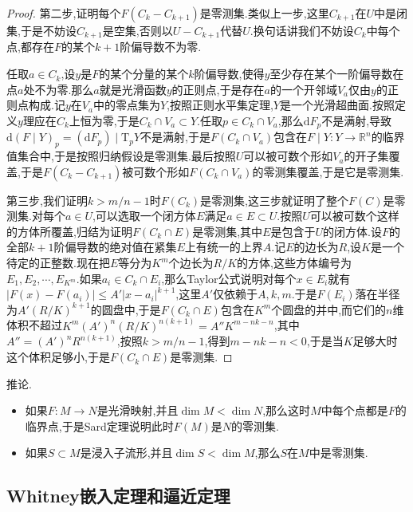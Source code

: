 \begin{proof}
	\qquad
	
	第二步,证明每个$F(C_k-C_{k+1})$是零测集.类似上一步,这里$C_{k+1}$在$U$中是闭集,于是不妨设$C_{k+1}$是空集,否则以$U-C_{k+1}$代替$U$.换句话讲我们不妨设$C_k$中每个点,都存在$F$的某个$k+1$阶偏导数不为零.
	
	\qquad
	
	任取$a\in C_k$,设$y$是$F$的某个分量的某个$k$阶偏导数,使得$y$至少存在某个一阶偏导数在点$a$处不为零.那么$a$就是光滑函数$y$的正则点,于是存在$a$的一个开邻域$V_a$仅由$y$的正则点构成.记$y$在$V_a$中的零点集为$Y$,按照正则水平集定理,$Y$是一个光滑超曲面.按照定义$y$理应在$C_k$上恒为零,于是$C_k\cap V_a\subset Y$.任取$p\in C_k\cap V_a$,那么$\mathrm{d}F_p$不是满射,导致$\mathrm{d}(F\mid Y)_p=(\mathrm{d}F_p)\mid\mathrm{T}_pY$不是满射,于是$F(C_k\cap V_a)$包含在$F\mid Y:Y\to\mathbb{R}^n$的临界值集合中,于是按照归纳假设是零测集.最后按照$U$可以被可数个形如$V_a$的开子集覆盖,于是$F(C_k-C_{k+1})$被可数个形如$F(C_k\cap V_a)$的零测集覆盖,于是它是零测集.
	
	\qquad
	
	第三步,我们证明$k>m/n-1$时$F(C_k)$是零测集,这三步就证明了整个$F(C)$是零测集.对每个$a\in U$,可以选取一个闭方体$E$满足$a\in E\subset U$.按照$U$可以被可数个这样的方体所覆盖,归结为证明$F(C_k\cap E)$是零测集,其中$E$是包含于$U$的闭方体.设$F$的全部$k+1$阶偏导数的绝对值在紧集$E$上有统一的上界$A$.记$E$的边长为$R$,设$K$是一个待定的正整数.现在把$E$等分为$K^m$个边长为$R/K$的方体,这些方体编号为$E_1,E_2,\cdots,E_{K^m}$.如果$a_i\in C_k\cap E_i$,那么Taylor公式说明对每个$x\in E_i$就有$|F(x)-F(a_i)|\le A'|x-a_i|^{k+1}$,这里$A'$仅依赖于$A,k,m$.于是$F(E_i)$落在半径为$A'(R/K)^{k+1}$的圆盘中,于是$F(C_k\cap E)$包含在$K^m$个圆盘的并中,而它们的$n$维体积不超过$K^m(A')^n(R/K)^{n(k+1)}=A''K^{m-nk-n}$,其中$A''=(A')^nR^{n(k+1)}$,按照$k>m/n-1$,得到$m-nk-n<0$,于是当$K$足够大时这个体积足够小,于是$F(C_k\cap E)$是零测集.
\end{proof}

推论.
\begin{itemize}
	\item 如果$F:M\to N$是光滑映射,并且$\dim M<\dim N$,那么这时$M$中每个点都是$F$的临界点,于是Sard定理说明此时$F(M)$是$N$的零测集.
	\item 如果$S\subset M$是浸入子流形,并且$\dim S<\dim M$,那么$S$在$M$中是零测集.
\end{itemize}

\subsection{Whitney嵌入定理和逼近定理}

